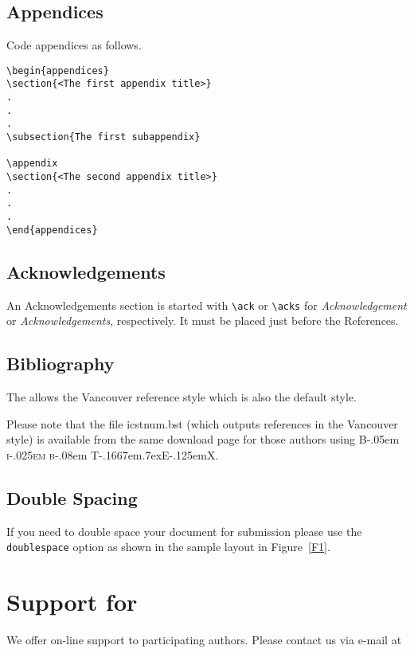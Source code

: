 \documentclass[fonts]{icst}
\newcommand\BibTeX{{\rmfamily B\kern-.05em \textsc{i\kern-.025em b}\kern-.08em
T\kern-.1667em\lower.7ex\hbox{E}\kern-.125emX}}
\begin{document}
\subsection{Appendices}
Code appendices as follows.
\begin{verbatim}
\begin{appendices}
\section{<The first appendix title>}
.
.
.
\subsection{The first subappendix}

\appendix
\section{<The second appendix title>}
.
.
.
\end{appendices}
\end{verbatim}


\subsection{Acknowledgements} An Acknowledgements section is started with \verb"\ack" or
\verb"\acks" for \textit{Acknowledgement} or
\textit{Acknowledgements}, respectively. It must be placed just
before the References.

\subsection{Bibliography}
The \emph{\journalnamelc} allows the Vancouver
reference style which is also the default style.

Please note that the file \textsf{icstnum.bst} (which outputs references in the Vancouver style) is available from the same
download page for those authors using \BibTeX.

\subsection{Double Spacing}
If you need to double space your document for submission please
use the \verb+doublespace+ option as shown in the sample layout in
Figure~\ref{F1}.

\section{Support for \textsf{\journalclass}}
We offer on-line support to participating authors. Please contact
us via e-mail at 
\end{document}
